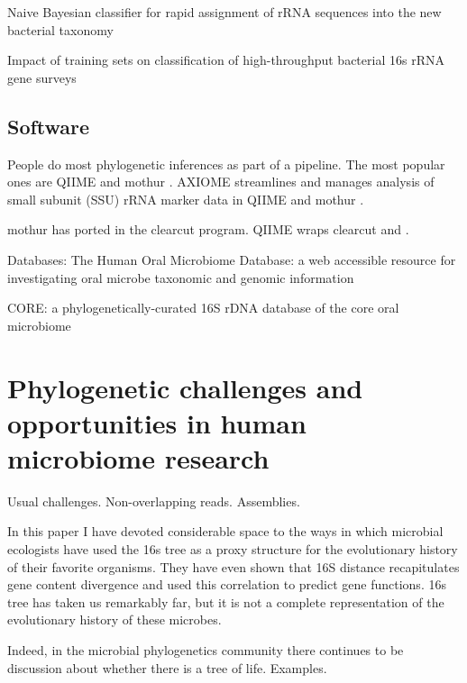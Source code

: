 \documentclass{amsart}
\begin{document}
\citep{huson2007megan}

\citep{wang2007naive}
{Naive Bayesian classifier for rapid assignment of rRNA sequences into the new bacterial taxonomy}

\citep{werner2011impact}
Impact of training sets on classification of high-throughput bacterial 16s rRNA gene surveys



\subsection{Software}

People do most phylogenetic inferences as part of a pipeline.
The most popular ones are QIIME \citep{caporaso2010qiime} and mothur \citep{schloss2009introducing}.
AXIOME streamlines and manages analysis of small subunit (SSU) rRNA marker data in QIIME and mothur \citep{lynch2013axiome}.

mothur has ported in the clearcut \citep{evans2006relaxed,sheneman2006clearcut} program.
QIIME wraps clearcut and \citep{price2010fasttree}.

Databases:
\citep{chen2010human}
The Human Oral Microbiome Database: a web accessible resource for investigating oral microbe taxonomic and genomic information

\citep{griffen2011core}
CORE: a phylogenetically-curated 16S rDNA database of the core oral microbiome

\citep{srinivasan2012bacterial}


\section{Phylogenetic challenges and opportunities in human microbiome research}

Usual challenges.
Non-overlapping reads.
Assemblies.

In this paper I have devoted considerable space to the ways in which microbial ecologists have used the 16s tree as a proxy structure for the evolutionary history of their favorite organisms.
They have even shown that 16S distance recapitulates gene content divergence and used this correlation to predict gene functions.
16s tree has taken us remarkably far, but it is not a complete representation of the evolutionary history of these microbes.

Indeed, in the microbial phylogenetics community there continues to be discussion about whether there is a tree of life.
Examples.
\end{document}
